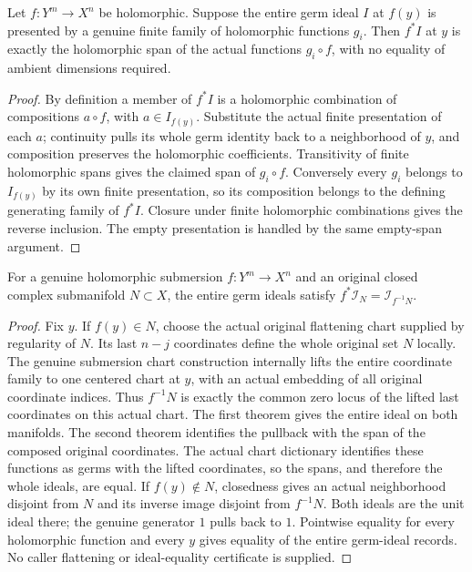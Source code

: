 \begin{theorem}
\label{hir:submersion-relative-finite-presentation}
Let $f:Y^m\to X^n$ be holomorphic. Suppose the entire germ ideal $I$ at $f(y)$
is presented by a genuine finite family of holomorphic functions $g_i$.
Then $f^*I$ at $y$ is exactly the holomorphic span of the actual functions
$g_i\circ f$, with no equality of ambient dimensions required.
\leanok
\begin{proof}
By definition a member of $f^*I$ is a holomorphic combination of compositions
$a\circ f$, with $a\in I_{f(y)}$. Substitute the actual finite presentation
of each $a$; continuity pulls its whole germ identity back to a neighborhood
of $y$, and composition preserves the holomorphic coefficients. Transitivity
of finite holomorphic spans gives the claimed span of $g_i\circ f$.
Conversely every $g_i$ belongs to $I_{f(y)}$ by its own finite presentation,
so its composition belongs to the defining generating family of $f^*I$.
Closure under finite holomorphic combinations gives the reverse inclusion.
The empty presentation is handled by the same empty-span argument.
\end{proof}
\end{theorem}

\begin{theorem}
\label{hir:submersion-relative-vanishing-ideal}
For a genuine holomorphic submersion $f:Y^m\to X^n$ and an original closed
complex submanifold $N\subset X$, the entire germ ideals satisfy
$f^*\mathcal I_N=\mathcal I_{f^{-1}N}$.
\leanok
\begin{proof}
Fix $y$. If $f(y)\in N$, choose the actual original flattening chart supplied
by regularity of $N$. Its last $n-j$ coordinates define the whole original
set $N$ locally. The genuine submersion chart construction internally lifts
the entire coordinate family to one centered chart at $y$, with an actual
embedding of all original coordinate indices. Thus $f^{-1}N$ is exactly the
common zero locus of the lifted last coordinates on this actual chart.
The first theorem gives the entire ideal on both manifolds. The second
theorem identifies the pullback with the span of the composed original
coordinates. The actual chart dictionary identifies these functions as germs
with the lifted coordinates, so the spans, and therefore the whole ideals,
are equal. If $f(y)\notin N$, closedness gives an actual neighborhood disjoint
from $N$ and its inverse image disjoint from $f^{-1}N$. Both ideals are the
unit ideal there; the genuine generator $1$ pulls back to $1$. Pointwise
equality for every holomorphic function and every $y$ gives equality of the
entire germ-ideal records. No caller flattening or ideal-equality certificate
is supplied.
\end{proof}
\end{theorem}


